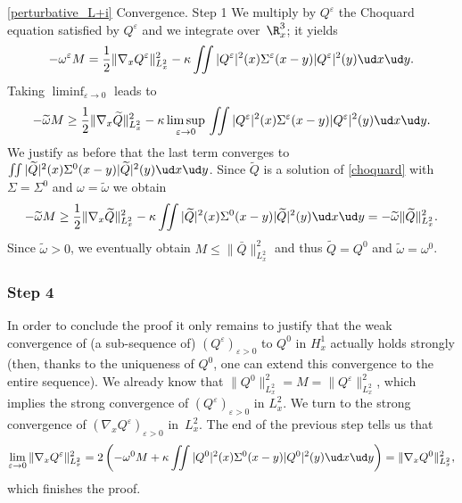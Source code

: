 \begin{ProofOf}{\eqref{perturbative_L+i} Convergence. Step 1}
We multiply by $Q^{\varepsilon}$ the Choquard equation satisfied
by $Q^{\varepsilon}$ and we integrate over~$\R_{x}^{3}$; it yields
\[
-\omega^{\varepsilon}M=\frac{1}{2}\|\nabla_{x}Q^{\varepsilon}\|_{L_{x}^{2}}^{2}-\kappa\iint|Q^{\varepsilon}|^{2}(x)\Sigma^{\varepsilon}(x-y)|Q^{\varepsilon}|^{2}(y)\ud x\ud y.
\]
Taking $\liminf_{\varepsilon\to 0}$ leads to
\[
-\widetilde{\omega}M\geq\frac{1}{2}\|\nabla_{x}\widetilde{Q}\|_{L_{x}^{2}}^{2}-\kappa\,\underset{\varepsilon\to 0}{\limsup}\,\iint|Q^{\varepsilon}|^{2}(x)\Sigma^{\varepsilon}(x-y)|Q^{\varepsilon}|^{2}(y)\ud x\ud y.
\]
We justify as before that the last term converges to $\iint|\widetilde{Q}|^{2}(x)\Sigma^{0}(x-y)|\widetilde{Q}|^{2}(y)\ud x\ud y$. Since $\widetilde{Q}$ is a solution of \eqref{choquard} with $\Sigma=\Sigma^{0}$ and $\omega=\widetilde{\omega}$ we obtain
\[
-\widetilde{\omega}M\geq\frac{1}{2}\|\nabla_{x}\widetilde{Q}\|_{L_{x}^{2}}^{2}-\kappa\iint|\widetilde{Q}|^{2}(x)\Sigma^{0}(x-y)|\widetilde{Q}|^{2}(y)\ud x\ud y=-\widetilde{\omega}\|\widetilde{Q}\|_{L_{x}^{2}}^{2}.
\]
Since $\widetilde{\omega}>0$, we eventually obtain $M\leq\|\bar{Q}\|_{L_{x}^{2}}^{2}$ and thus $\widetilde{Q}=Q^{0}$ and $\widetilde{\omega}=\omega^{0}$.

\subsubsection*{Step 4} In order to conclude the proof it only remains to justify that the weak convergence of (a sub-sequence of) $(Q^{\varepsilon})_{\varepsilon>0}$ to $Q^{0}$ in $H_{x}^{1}$ actually holds strongly (then, thanks to the uniqueness of $Q^{0}$, one can extend this convergence to the entire sequence). We already know that $\|Q^{0}\|_{L_{x}^{2}}^{2}=M=\|Q^{\varepsilon}\|_{L_{x}^{2}}^{2}$, which implies the strong convergence of $(Q^{\varepsilon})_{\varepsilon>0}$ in $L_{x}^{2}$. We turn to the strong convergence of $(\nabla_{x}Q^{\varepsilon})_{\varepsilon>0}$ in~$L_{x}^{2}$. The end of the previous step tells us that
\[
\underset{\varepsilon\to 0}{\lim}\,\|\nabla_{x}Q^{\varepsilon}\|_{L_{x}^{2}}^{2}=
2\left(
-\omega^{0}M+\kappa\iint|Q^{0}|^{2}(x)\Sigma^{0}(x-y)|Q^{0}|^{2}(y)\ud x\ud y \right)=\|\nabla_{x}Q^{0}\|_{L_{x}^{2}}^{2},
\]
which finishes the proof.
\end{ProofOf}

